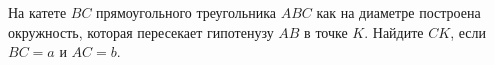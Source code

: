 \begin{ex}
	\begin{condition}
		На катете \( BC  \) прямоугольного треугольника \( ABC \) как на диаметре построена окружность, которая пересекает гипотенузу \( AB  \) в точке \( K \). Найдите \( CK \), если \( BC = a  \) и \( AC = b \).
	\end{condition}
\end{ex}